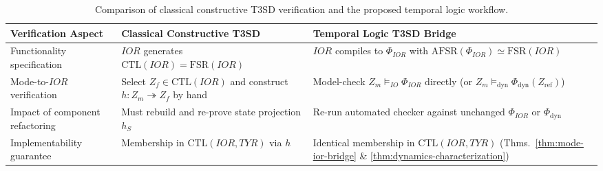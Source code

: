 \begin{table}[t]
\caption{Comparison of classical constructive T3SD verification and the proposed temporal logic workflow.}
\label{tab:comparison}
\renewcommand{\arraystretch}{1.25}
\footnotesize
\begin{tabularx}{\textwidth}{@{}A{0.24\textwidth}YY@{}}
    \toprule
    \textbf{Verification Aspect} & \textbf{Classical Constructive T3SD} & \textbf{Temporal Logic T3SD Bridge} \\
    \midrule
    Functionality specification & $IOR$ generates $\mathrm{CTL}(IOR)=\mathrm{FSR}(IOR)$ & $IOR$ compiles to $\Phi_{IOR}$ with $\mathrm{AFSR}(\Phi_{IOR})\simeq\mathrm{FSR}(IOR)$ \\
    Mode-to-$IOR$ verification & Select $Z_f\in\mathrm{CTL}(IOR)$ and construct $h:Z_m\twoheadrightarrow Z_f$ by hand & Model-check $Z_m\models_{IO}\Phi_{IOR}$ directly (or $Z_m\models_{\mathrm{dyn}}\Phi_{\mathrm{dyn}}(Z_{\mathrm{ref}})$) \\
    Impact of component refactoring & Must rebuild and re-prove state projection $h_S$ & Re-run automated checker against unchanged $\Phi_{IOR}$ or $\Phi_{\mathrm{dyn}}$ \\
    Implementability guarantee & Membership in $\mathrm{CTL}(IOR,TYR)$ via $h$ & Identical membership in $\mathrm{CTL}(IOR,TYR)$ (Thms.~\ref{thm:mode-ior-bridge} \& \ref{thm:dynamics-characterization}) \\
    \bottomrule
\end{tabularx}
\end{table}



